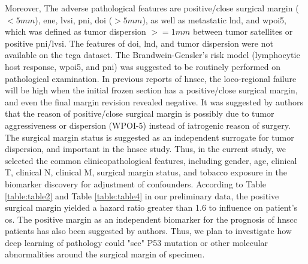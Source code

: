 \documentclass[12pt, a4paper]{article}
\begin{document}
Moreover, The adverse pathological features are positive/close surgical margin ($<5 mm$), \acrfull{ene}, \acrfull{lvsi}, \acrfull{pni}, \acrfull{doi} ($>5 mm$), as well as metastatic \acrfull{lnd}\citep{Cheraghlou2018}, and \acrfull{wpoi5}, which was defined as tumor dispersion $>= 1 mm$ between tumor satellites or positive \acrshort{pni}/\acrshort{lvsi}\citep{Amin2017}.
The features of \acrshort{doi}, \acrshort{lnd}, and tumor dispersion were not available on the \acrshort{tcga} dataset. The Brandwein-Gensler's risk model (lymphocytic host response, \acrshort{wpoi5}, and \acrshort{pni})\citep{Brandwein-Gensler2010}\citep{Sinha2018} was suggested to be routinely performed on pathological examination. In previous reports of \acrshort{hnscc}, the loco-regional failure will be high when the initial frozen section has a positive/close surgical margin, and even the final margin revision revealed negative\citep{Clark2017a}\citep{Bulbul2019b}.  %
It was suggested by authors \citep{Scholl1986}\citep{Sutton2003}\citep{Shaw2004}\citep{Guillemaud2010a}\citep{Patel2010}\citep{Kuriakose2017}\citep{Shapiro2017}\citep{Saidak2018}\citep{Miguelanez-Medran2019}\citep{Saidak2019} that the reason of positive/close surgical margin is possibly due to tumor aggressiveness or dispersion (WPOI-5) instead of iatrogenic reason of surgery. The surgical margin status is suggested as an independent surrogate for tumor dispersion, and important in the \acrshort{hnscc} study. Thus, in the current study, we selected the common clinicopathological features, including gender, age, clinical T, clinical N, clinical M, surgical margin status, and tobacco exposure in the biomarker discovery for adjustment of confounders.%
According to Table \ref{table:table2} and Table \ref{table:table4} in our preliminary data, the positive surgical margin yielded a hazard ratio greater than 1.6 to influence on patient's \acrshort{os}. The positive margin as an independent biomarker for the prognosis of \acrshort{hnscc} patients has also been suggested by authors\citep{SLAUGHTER1953}\citep{Tabor2001}\citep{Ha2003}\citep{Bilde2009}\citep{Reis2011}\citep{Chi2020}.
Thus, we plan to investigate how deep learning of pathology could "see" P53 mutation or other molecular abnormalities around the surgical margin of specimen.
\end{document}
